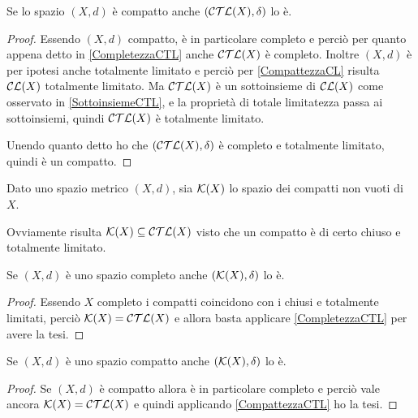 \begin{corollary}\label{CompattezzaCTL}
	Se lo spazio $(X,d)$ è compatto anche $(\mathcal{CTL}(X),\delta)$ lo è.
\end{corollary}
\begin{proof}
	Essendo $(X,d)$ compatto, è in particolare completo e perciò per quanto appena detto in \cref{CompletezzaCTL} anche $\mathcal{CTL}(X)$ è completo. Inoltre $(X,d)$ è per ipotesi anche totalmente limitato e perciò per \cref{CompattezzaCL} risulta $\mathcal{CL}(X)$ totalmente limitato. Ma $\mathcal{CTL}(X)$ è un sottoinsieme di $\mathcal{CL}(X)$ come osservato in \cref{SottoinsiemeCTL}, e la proprietà di totale limitatezza passa ai sottoinsiemi, quindi $\mathcal{CTL}(X)$ è totalmente limitato.
	
	Unendo quanto detto ho che $(\mathcal{CTL}(X),\delta)$ è completo e totalmente limitato, quindi è un compatto.
\end{proof}

\begin{definition}
	Dato uno spazio metrico $(X,d)$, sia $\mathcal{K}(X)$ lo spazio dei compatti non vuoti di $X$.
\end{definition}
\begin{remark}
	Ovviamente risulta $\mathcal{K}(X)\subseteq \mathcal{CTL}(X)$ visto che un compatto è di certo chiuso e totalmente limitato.
\end{remark}

\begin{corollary}
	Se $(X,d)$ è uno spazio completo anche $(\mathcal{K}(X),\delta)$ lo è.
\end{corollary}
\begin{proof}
	Essendo $X$ completo i compatti coincidono con i chiusi e totalmente limitati, perciò $\mathcal{K}(X)=\mathcal{CTL}(X)$ e allora basta applicare \cref{CompletezzaCTL} per avere la tesi.
\end{proof}


\begin{corollary}
	Se $(X,d)$ è uno spazio compatto anche $(\mathcal{K}(X),\delta)$ lo è.
\end{corollary}
\begin{proof}
	Se $(X,d)$ è compatto allora è in particolare completo e perciò vale ancora $\mathcal{K}(X)=\mathcal{CTL}(X)$ e quindi applicando \cref{CompattezzaCTL} ho la tesi. 
\end{proof}






